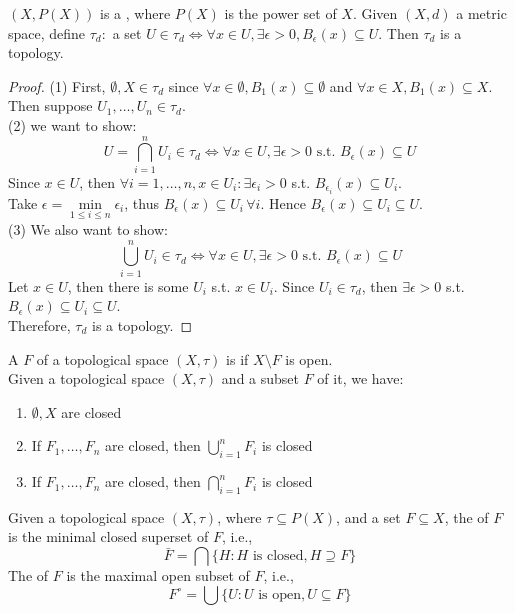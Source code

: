\documentclass[11pt]{article}
\begin{document}
\example
$(X, P(X))$ is a , where $P(X)$ is the power set of $X$.
\example
Given $(X, d)$ a metric space, define $\tau_d: $ a set $U \in \tau_d \iff \forall x \in U, \exists \epsilon > 0, B_\epsilon(x) \subseteq U$. Then $\tau_d$ is a topology.
\begin{proof}
	(1) First, $\emptyset, X \in \tau_d$ since $\forall x \in \emptyset, B_1(x) \subseteq \emptyset$ and $\forall x \in X, B_1(x) \subseteq X$.\\
	Then suppose $U_1, \hdots, U_n \in \tau_d$.\\
	(2) we want to show:
	$$U = \bigcap_{i=1}^n U_i \in \tau_d \iff \forall x \in U, \exists \epsilon > 0 \text{ s.t. } B_\epsilon(x) \subseteq U$$
	Since $x \in U$, then $\forall i = 1, \hdots, n, x \in U_i: \exists \epsilon_i > 0$ s.t. $B_{\epsilon_i}(x) \subseteq U_i$. \\
	Take $\epsilon = \underset{1 \leq i \leq n}{\min} \epsilon_i$, thus $B_\epsilon(x) \subseteq U_i \, \forall i$. Hence $B_\epsilon(x) \subseteq U_i \subseteq U$. \\
	(3) We also want to show:
	$$\bigcup_{i=1}^n U_i \in \tau_d \iff \forall x \in U, \exists \epsilon > 0 \text{ s.t. } B_\epsilon(x) \subseteq U$$
	Let $x \in U$, then there is some $U_i$ s.t. $x \in U_i$. Since $U_i \in \tau_d$, then $\exists \epsilon >0$ s.t. $B_\epsilon(x) \subseteq U_i \subseteq U$.\\
	Therefore, $\tau_d$ is a topology.
\end{proof}

A  $F$ of a topological space $(X, \tau)$ is  if $X \setminus F$ is open. \\
\property Given a topological space $(X, \tau)$ and a subset $F$ of it, we have: 
\begin{enumerate}
	\item $\emptyset, X$ are closed
	\item If $F_1, \hdots, F_n$ are closed, then $\bigcup_{i=1}^n F_i$ is closed
	\item If $F_1, \hdots, F_n$ are closed, then $\bigcap_{i=1}^n F_i$ is closed
\end{enumerate}

Given a topological space $(X, \tau)$, where $\tau \subseteq P(X)$, and a set $F \subseteq X$, the  of $F$ is the minimal closed superset of $F$, i.e.,
$$\bar{F} = \bigcap \{H: H \text{ is closed}, H \supseteq F\}$$
The  of $F$ is the maximal open subset of $F$, i.e.,
$$F^\circ = \bigcup \{U: U \text{ is open}, U \subseteq F\}$$
\end{document}
